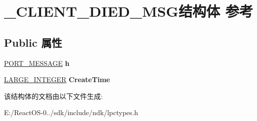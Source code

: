 \hypertarget{struct___c_l_i_e_n_t___d_i_e_d___m_s_g}{}\section{\+\_\+\+C\+L\+I\+E\+N\+T\+\_\+\+D\+I\+E\+D\+\_\+\+M\+S\+G结构体 参考}
\label{struct___c_l_i_e_n_t___d_i_e_d___m_s_g}
\subsection*{Public 属性}
\begin{DoxyCompactItemize}
\item 
\mbox{\label{struct___c_l_i_e_n_t___d_i_e_d___m_s_g_a61fcbc592256e7602cc6ee71587ff67f}} 
\hyperlink{struct___p_o_r_t___m_e_s_s_a_g_e___h_e_a_d_e_r}{P\+O\+R\+T\+\_\+\+M\+E\+S\+S\+A\+GE} {\bfseries h}
\item 
\mbox{\label{struct___c_l_i_e_n_t___d_i_e_d___m_s_g_a634abf68eb3b981d072274a72af93402}} 
\hyperlink{union___l_a_r_g_e___i_n_t_e_g_e_r}{L\+A\+R\+G\+E\+\_\+\+I\+N\+T\+E\+G\+ER} {\bfseries Create\+Time}
\end{DoxyCompactItemize}


该结构体的文档由以下文件生成\+:\begin{DoxyCompactItemize}
\item 
E\+:/\+React\+O\+S-\/0../sdk/include/ndk/lpctypes.\+h\end{DoxyCompactItemize}
